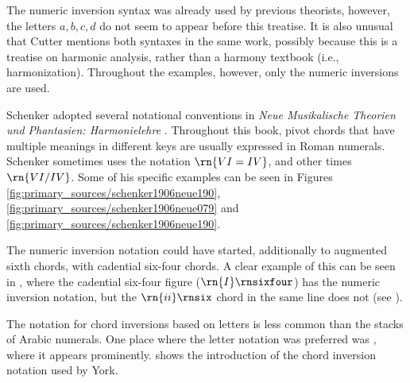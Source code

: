 
The numeric inversion syntax was already used by previous
theorists, however, the letters ${a, b, c , d}$ do not seem
to appear before this treatise. It is also unusual that
Cutter mentions both syntaxes in the same work, possibly
because this is a treatise on harmonic analysis, rather than
a harmony textbook (i.e., harmonization). Throughout the
examples, however, only the numeric inversions are used.

Schenker adopted several notational conventions in
\emph{Neue Musikalische Theorien und Phantasien:
Harmonielehre} \parencite{schenker1906neue}. Throughout this
book, pivot chords that have multiple meanings in different
keys are usually expressed in Roman numerals. Schenker
sometimes uses the notation $\rn{VI=IV}$, and other times
$\rn{VI/IV}$. Some of his specific examples can be seen in
Figures \ref{fig:primary_sources/schenker1906neue190},
\ref{fig:primary_sources/schenker1906neue079} and
\ref{fig:primary_sources/schenker1906neue190}.




The numeric inversion notation could have started,
additionally to augmented sixth chords, with cadential
six-four chords. A clear example of this can be seen in
\textcite{loewengard1908lehrbuch}, where the cadential
six-four figure ($\rn{I}\rnsixfour$) has the numeric
inversion notation, but the $\rn{ii}\rnsix$ chord in the
same line does not (see
).


The notation for chord inversions based on letters is less
common than the stacks of Arabic numerals. One place where
the letter notation was preferred was
\textcite{york1909practical}, where it appears prominently.
 shows the
introduction of the chord inversion notation used by York.


